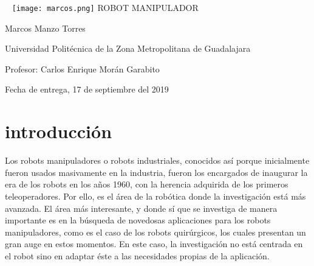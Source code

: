 \documentclass[11pt,a4paper,oldfontcommands,oneside]{memoir}
\begin{document}
%
%
\thispagestyle{empty}

{%
\sffamily
\centering
\Large

~\vspace{\fill}
\texttt{[image: marcos.png]}
{\huge 
ROBOT MANIPULADOR
}
\vspace{2.5cm}

{\LARGE
Marcos Manzo Torres
}

\vspace{3.5cm}

Universidad Politécnica de la Zona Metropolitana de Guadalajara

\vspace{3.5cm}

Profesor: Carlos Enrique Morán Garabito

\vspace{\fill}

Fecha de entrega, 17 de septiembre del 2019

}%

\vspace{4.5cm}




\tableofcontents*

\clearpage


\chapter{introducción}

Los robots manipuladores o robots industriales, conocidos así porque inicialmente fueron usados masivamente en la industria, fueron los encargados de inaugurar la era de los robots en los años 1960, con la herencia adquirida de los primeros teleoperadores. Por ello, es el área de la robótica donde la investigación está más avanzada. El área más interesante, y donde sí que se investiga de manera importante es en la búsqueda de novedosas aplicaciones para los robots manipuladores, como es el caso de los robots quirúrgicos, los cuales presentan un gran auge en estos momentos. En este caso, la investigación no está centrada en el robot sino en adaptar éste a las necesidades propias de la aplicación. 
\end{document}
